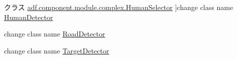 \begin{DoxyRefList}
クラス \hyperlink{classadf_1_1component_1_1module_1_1complex_1_1HumanSelector}{adf.component.module.complex.Human\+Selector} ]change class name \hyperlink{classadf_1_1component_1_1module_1_1complex_1_1HumanDetector}{Human\+Detector}  
\item[\label{deprecated__deprecated000015}%
\hypertarget{deprecated__deprecated000015}{}%
クラス \hyperlink{classadf_1_1component_1_1module_1_1complex_1_1RoadSelector}{adf.component.module.complex.Road\+Selector} ]change class name \hyperlink{classadf_1_1component_1_1module_1_1complex_1_1RoadDetector}{Road\+Detector}  
\item[\label{deprecated__deprecated000016}%
\hypertarget{deprecated__deprecated000016}{}%
クラス \hyperlink{classadf_1_1component_1_1module_1_1complex_1_1TargetSelector}{adf.component.module.complex.Target\+Selector$<$ E extends Standard\+Entity $>$} ]change class name \hyperlink{classadf_1_1component_1_1module_1_1complex_1_1TargetDetector}{Target\+Detector} 
\end{DoxyRefList}
